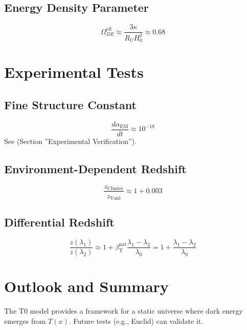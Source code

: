 \documentclass[a4paper,12pt]{article}
\theoremstyle{definition}
\theoremstyle{remark}
\newcommand{\Tfield}{T(x)}
\newcommand{\betaT}{\beta_{\text{T}}}
\begin{document}
	\subsection{Energy Density Parameter}
	
	\begin{equation}
		\Omega_{DE}^{\text{eff}} \approx \frac{3 \kappa}{R_U H_0^2} \approx 0.68
	\end{equation}
	
	\section{Experimental Tests}
	
	\subsection{Fine Structure Constant}
	
	\begin{equation}
		\frac{d \alpha_{\text{EM}}}{d t} \approx 10^{-18}
	\end{equation}
	See \cite{pascher_photons_2025} (Section ''Experimental Verification'').
	
	\subsection{Environment-Dependent Redshift}
	
	\begin{equation}
		\frac{z_{\text{Cluster}}}{z_{\text{Void}}} \approx 1 + 0.003
	\end{equation}
	
	\subsection{Differential Redshift}
	
	\begin{equation}
		\frac{z(\lambda_1)}{z(\lambda_2)} \approx 1 + \betaT^{\text{nat}} \frac{\lambda_1 - \lambda_2}{\lambda_0} = 1 + \frac{\lambda_1 - \lambda_2}{\lambda_0}
	\end{equation}
	
	\section{Outlook and Summary}
	
	The T0 model provides a framework for a static universe where dark energy emerges from \(\Tfield\). Future tests (e.g., Euclid) can validate it.
	
\end{document}

